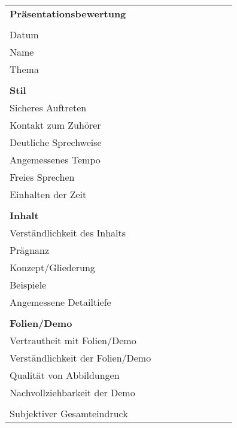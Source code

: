 \documentclass[12pt]{scrartcl}
\begin{document}
\newpage
{}
\thispagestyle{empty}
\begin{sideways}
	\begin{tabular}{|l|p{1.8cm}|p{1.8cm}|p{1.8cm}|p{1.8cm}|p{1.8cm}|p{1.8cm}|p{1.8cm}|p{1.8cm}|}
	\multicolumn{6}{l}{\textbf{Präsentationsbewertung}} \\ 
	\multicolumn{6}{l}{} \\ 
	\hline 
	Datum                                    & & & & & & & \\ \hline
	Name                                     & & & & & & & \\ \hline
	Thema                                    & & & & & & & \\ \hline 
	\multicolumn{6}{l}{} \\ 
	\multicolumn{6}{l}{\textbf{Stil}} \\ 
	\hline 
	Sicheres Auftreten                       & & & & & & & \\ \hline
	Kontakt zum Zuhörer                      & & & & & & & \\ \hline
	Deutliche Sprechweise                    & & & & & & & \\ \hline
	Angemessenes Tempo                       & & & & & & & \\ \hline
	Freies Sprechen                          & & & & & & & \\ \hline
	Einhalten der Zeit                       & & & & & & & \\ \hline 
	\multicolumn{6}{l}{} \\ 
	\multicolumn{6}{l}{\textbf{Inhalt}} \\ 
	\hline 
	Verständlichkeit des Inhalts             & & & & & & & \\ \hline
	Prägnanz                                 & & & & & & & \\ \hline
	Konzept/Gliederung                       & & & & & & & \\ \hline
	Beispiele                                & & & & & & & \\ \hline
	Angemessene Detailtiefe                  & & & & & & & \\ \hline 
	\multicolumn{6}{l}{} \\ 
	\multicolumn{6}{l}{\textbf{Folien/Demo}} \\ 
	\hline 
	Vertrautheit mit Folien/Demo             & & & & & & & \\ \hline
	Verständlichkeit der Folien/Demo         & & & & & & & \\ \hline
	Qualität von Abbildungen                 & & & & & & & \\ \hline
	Nachvollziehbarkeit der Demo             & & & & & & & \\ \hline 
	\multicolumn{6}{l}{} \\ 
	\hline
	Subjektiver Gesamteindruck               & & & & & & & \\ \hline
	\end{tabular}
\end{sideways}
\end{document}
